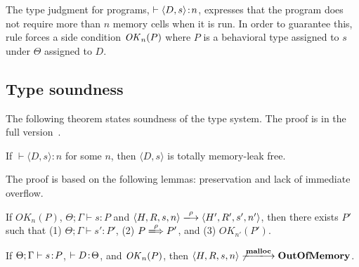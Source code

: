 The type judgment for programs, \(\vdash \langle D, s \rangle \!:\! n\),
expresses that the program does not require more than \(n\) memory
cells when it is run.  In order to guarantee this, rule 
forces a side condition \(\mathit{OK}_n(P)\) where \(P\) is a behavioral type
assigned to \(s\) under \(\Theta\) assigned to \(D\).

\subsection{Type soundness}


The following theorem states soundness of the type system.  The proof
is in the full version~\cite{fullversion}.

\begin{theorem}\label{thm1}
If $\vdash \langle D, s \rangle : n$ for some \(n\), then \(\langle D,
s \rangle\) is totally memory-leak free.
\end{theorem}


The proof is based on the following lemmas: preservation and lack of
immediate overflow.

\begin{lemma}[Preservation]
\label{lem:preservation}
If $OK_{n}(P)$, $\Theta; \Gamma \vdash s : P$ and $\langle H,R,s,n
\rangle \xlongrightarrow{\rho} \langle H',R',s', n' \rangle$, then
there exists $P'$ such that (1) $ \Theta; \Gamma \vdash s' : P'$, (2)
\(P \xLongrightarrow{\rho} P'\), and (3) \(OK_{n'}(P')\).
\end{lemma}


\begin{lemma}
\label{lem:immediateSafety}
If $\Theta; \Gamma \vdash s \!:\! P$, \(\vdash D \!:\! \Theta\), and
\(\mathit{OK}_n(P)\), then $\langle H, R, s, n \rangle
\not\xlongrightarrow{\Malloc} \OVERFLOW$.
\end{lemma}
